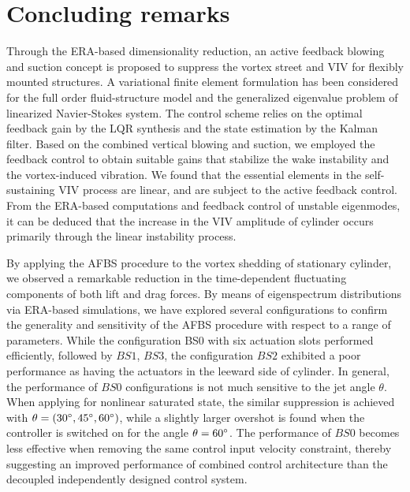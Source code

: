\documentclass[standard]{jfm}
\begin{document}
\section{Concluding remarks}\label{sec:concluding}
Through the ERA-based dimensionality reduction, an active feedback blowing 
and suction concept is proposed to suppress the vortex street and VIV for 
flexibly mounted structures.
A variational finite element formulation has been considered for the full order 
fluid-structure model and the generalized eigenvalue problem of 
linearized Navier-Stokes system.
The control scheme relies on the optimal feedback gain by the LQR synthesis and the state estimation by 
the Kalman filter.
Based on the combined vertical blowing and suction,
we employed the feedback control to obtain suitable gains that stabilize the wake instability 
and the vortex-induced vibration. 
We found that the essential elements in the self-sustaining VIV process are linear, 
and are subject to the active feedback control.
From the ERA-based computations and feedback control of unstable eigenmodes, 
it can be deduced that the increase in the VIV amplitude of cylinder occurs primarily through the linear instability process. 

By applying the AFBS procedure to the vortex shedding of stationary cylinder, we
observed a remarkable reduction in the time-dependent fluctuating
components of both  lift and drag forces. 
By means of eigenspectrum distributions via ERA-based simulations, 
we have explored several configurations to 
confirm the generality and sensitivity of the AFBS procedure 
with respect to a range of parameters.
While the configuration BS0 with six actuation slots 
performed efficiently, followed by $BS1$, $BS3$, the configuration 
$BS2$ exhibited a poor performance as having the actuators in the leeward side of cylinder.
In general, the performance of $BS0$ configurations is not much sensitive to the jet angle $\theta$. When applying for 
nonlinear saturated state, the similar suppression is achieved with $\theta=(30 \degree, 45 \degree, 60 \degree)$,
while a slightly larger overshot is found when the controller is switched on for the angle $\theta=60 \degree$. 
The performance of $BS0$ becomes less effective when removing the same control 
input velocity constraint, thereby suggesting an improved 
performance of combined control architecture than 
the decoupled independently designed control system. 
\end{document}
